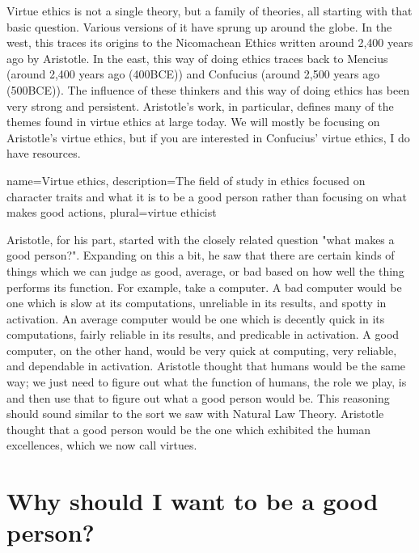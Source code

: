 \Gls{Virtue ethics} is not a single theory, but a family of theories, all starting with that basic question. Various versions of it have sprung up around the globe. In the west, this traces its origins to the Nicomachean Ethics written around 2,400 years ago by Aristotle. In the east, this way of doing ethics traces back to Mencius (around 2,400 years ago (400BCE)) and Confucius (around 2,500 years ago (500BCE)). The influence of these thinkers and this way of doing ethics has been very strong and persistent. Aristotle’s work, in particular, defines many of the themes found in virtue ethics at large today.  We will mostly be focusing on Aristotle’s virtue ethics, but if you are interested in Confucius’ virtue ethics, I do have resources.

{
  name=Virtue ethics,
  description={The field of study in ethics focused on character traits and what it is to be a good person rather than focusing on what makes good actions},
  plural=virtue ethicist
}



Aristotle, for his part, started with the closely related question "what makes a good person?". Expanding on this a bit, he saw that there are certain kinds of things which we can judge as good, average, or bad based on how well the thing performs its function. For example, take a computer. A bad computer would be one which is slow at its computations, unreliable in its results, and spotty in activation. An average computer would be one which is decently quick in its computations, fairly reliable in its results, and predicable in activation. A good computer, on the other hand, would be very quick at computing, very reliable, and dependable in activation. Aristotle thought that humans would be the same way; we just need to figure out what the function of humans, the role we play, is and then use that to figure out what a good person would be. This reasoning should sound similar to the sort we saw with Natural Law Theory. Aristotle thought that a good person would be the one which exhibited the human excellences, which we now call virtues. 

\section{Why should I want to be a good person?}

